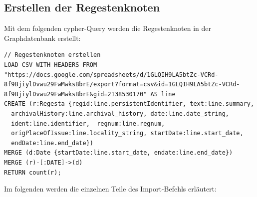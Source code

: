\documentclass[ngerman,]{scrreprt}
\begin{document}
\hypertarget{erstellen-der-regestenknoten}{%
\subsection{Erstellen der Regestenknoten}\label{erstellen-der-regestenknoten}}

Mit dem folgenden cypher-Query werden die Regestenknoten in der Graphdatenbank erstellt:

\begin{verbatim}
// Regestenknoten erstellen
LOAD CSV WITH HEADERS FROM "https://docs.google.com/spreadsheets/d/1GLQIH9LA5btZc-VCRd-8f9BjiylDvwu29FwMwksBbrE/export?format=csv&id=1GLQIH9LA5btZc-VCRd-8f9BjiylDvwu29FwMwksBbrE&gid=2138530170" AS line
CREATE (r:Regesta {regid:line.persistentIdentifier, text:line.summary,
  archivalHistory:line.archival_history, date:line.date_string,  
  ident:line.identifier,  regnum:line.regnum,
  origPlaceOfIssue:line.locality_string, startDate:line.start_date,
  endDate:line.end_date})
MERGE (d:Date {startDate:line.start_date, endate:line.end_date})
MERGE (r)-[:DATE]->(d)
RETURN count(r);
\end{verbatim}

Im folgenden werden die einzelnen Teile des Import-Befehls erläutert:
\end{document}
